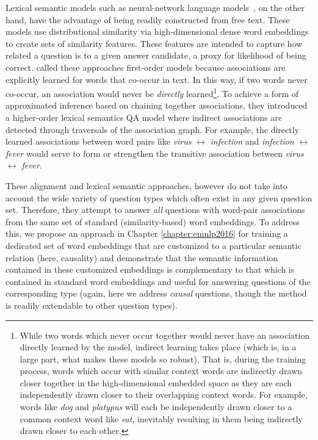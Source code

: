 Lexical semantic models such as neural-network language models~\citep{jansen14,sultan-etal:2014:TACL,yih13}, on the other hand, have the advantage of being readily constructed from free text.  These models use distributional similarity via high-dimensional dense word embeddings to create sets of similarity features.  These features are intended to capture how related a question is to a given answer candidate, a proxy for likelihood of being correct.   
\citet{fried2015higher} called these approaches first-order models because associations are explicitly learned for words that co-occur in text.  In this way, if two words never co-occur, an association would never be \emph{directly} learned\footnote{While two words which never occur together would never have an association directly learned by the model, indirect learning takes place (which is, in a large part, what makes these models so robust).  That is, during the training process, words which occur with similar context words are indirectly drawn closer together in the high-dimensional embedded space as they are each independently drawn closer to their overlapping context words.  For example, words like \emph{dog} and \emph{platypus} will each be independently drawn closer to a common context word like \emph{eat}, inevitably resulting in them being indirectly drawn closer to each other.}.   To achieve a form of approximated inference based on chaining together associations, they introduced a higher-order lexical semantics QA model where indirect associations are detected through traversals of the association graph.  For example, the directly learned associations between word pairs like \textit{virus} $\leftrightarrow$ \textit{infection} and \textit{infection} $\leftrightarrow$ \textit{fever} would serve to form or strengthen the transitive association between \textit{virus} $\leftrightarrow$ \textit{fever}. 

These alignment and lexical semantic approaches, however do not take into account the wide variety of question types which often exist in any given question set.  Therefore, they attempt to answer \emph{all} questions with word-pair associations from the same set of standard (similarity-based) word embeddings.  To address this, we propose an approach in Chapter \ref{chapter:emnlp2016} for training a dedicated set of word embeddings that are customized to a particular semantic relation (here, causality) and demonstrate that the semantic information contained in these customized embeddings is complementary to that which is contained in standard word embeddings and useful for answering questions of the corresponding type (again, here we address \textit{causal} questions, though the method is readily extendable to other question types).

